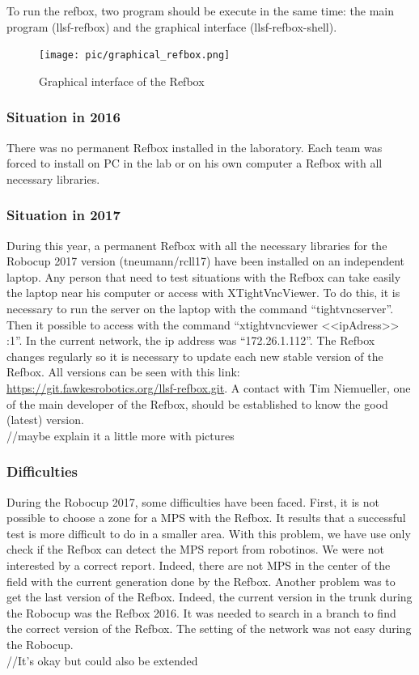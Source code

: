 To run the refbox, two program should be execute in the same time: the main program (llsf-refbox) and the graphical interface (llsf-refbox-shell).

\begin{figure}[!h]
\centering
\texttt{[image: pic/graphical\_refbox.png]}
\caption{Graphical interface of the Refbox}
\label{fig:graphicalRefbox}
\end{figure}

\subsubsection{Situation in 2016}

There was no permanent Refbox installed in the laboratory. Each team was forced to install on PC in the lab or on his own computer a Refbox with all necessary libraries. \\


\subsubsection{Situation in 2017}

During this year, a permanent Refbox with all the necessary libraries for the Robocup 2017 version (tneumann/rcll17) have been installed on an independent laptop. Any person that need to test situations with the Refbox can take easily the laptop near his computer or access with XTightVncViewer.  To do this, it is necessary to run the server on the laptop with the command “tightvncserver”. Then it possible to access with the command “xtightvncviewer <<ipAdress>> :1”.  In the current network, the ip address was “172.26.1.112”. The Refbox changes regularly so it is necessary to update each new stable version of the Refbox. All versions can be seen with this link: \url{https://git.fawkesrobotics.org/llsf-refbox.git}. A contact with Tim Niemueller, one of the main developer of the Refbox, should be established to know the good (latest) version. \\

//maybe explain it a little more with pictures



\subsubsection{Difficulties}

During the Robocup 2017, some difficulties have been faced. First, it is not possible to choose a zone for a MPS with the Refbox. It results that a successful test is more difficult to do in a smaller area. With this problem, we have use only check if the Refbox can detect the MPS report from robotinos. We were not interested by a correct report. Indeed, there are not MPS in the center of the field with the current generation done by the Refbox. Another problem was to get the last version of the Refbox. Indeed, the current version in the trunk during the Robocup was the Refbox 2016. It was needed to search in a branch to find the correct version of the Refbox. The setting of the network was not easy during the Robocup. \\

//It's okay but could also be extended
